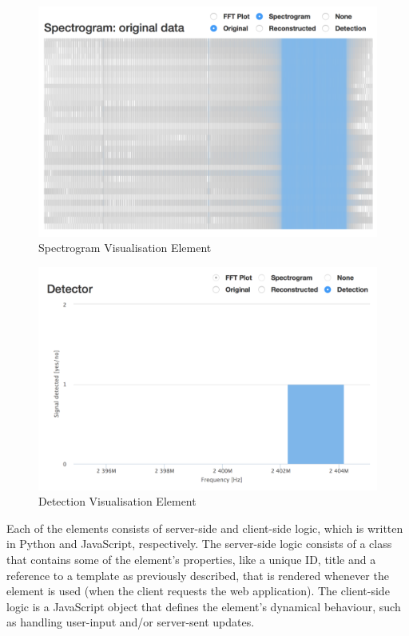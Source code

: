 \documentclass[a4paper, openany, oneside]{memoir}
\begin{document}
\begin{description}
\begin{figure}[H]
    \centering
    \includegraphics[width=\textwidth]{figures/spectrogram.png}
    \caption{Spectrogram Visualisation Element}
    \label{fig:spectrogram_element}
\end{figure}

\begin{figure}[H]
    \centering
    \includegraphics[width=\textwidth]{figures/detection.png}
    \caption{Detection Visualisation Element}
    \label{fig:detection_element}
\end{figure}

\end{description}

Each of the elements consists of server-side and client-side logic, which is written in Python and JavaScript, respectively. The server-side logic consists of a class that contains some of the element's properties, like a unique ID, title and a reference to a  template as previously described, that is rendered whenever the element is used (when the client requests the web application). The client-side logic is a JavaScript object that defines the element's dynamical behaviour, such as handling user-input and/or server-sent updates.
\end{document}

